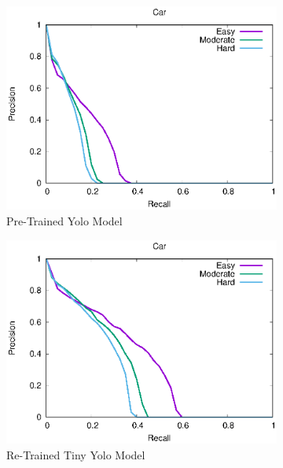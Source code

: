 \begin{figure}[H]
\begin{subfigure}{.34\textwidth}
    \centering
    \includegraphics[width=1.0\linewidth]{img/yolo_Nov_4/plot_valid/car_detection.eps}
    \caption{Pre-Trained Yolo Model}
\end{subfigure}%
\begin{subfigure}{.34\textwidth}
    \centering
    \includegraphics[width=1.0\linewidth]{img/yolo_Nov_9/plot_valid/car_detection.eps}
    \caption{Re-Trained Tiny Yolo Model}
\end{subfigure}%
\begin{subfigure}{.34\textwidth}
    \centering

\end{subfigure}
\end{figure}
